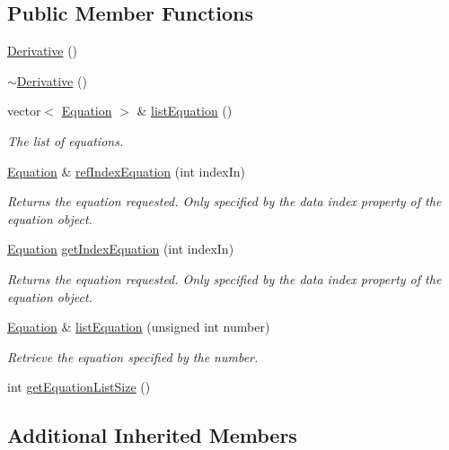 \subsection*{Public Member Functions}
\begin{DoxyCompactItemize}
\item 
\hyperlink{class_derivative_adc03ec3ad150bc0de66a3e7200cd368f}{Derivative} ()
\item 
\hyperlink{class_derivative_a7fc4ee53f460dfb98b3db2e9c9830cf9}{$\sim$\-Derivative} ()
\item 
vector$<$ \hyperlink{class_equation}{Equation} $>$ \& \hyperlink{class_derivative_a7fa63ee738fcafcf3fccb796da095946}{list\-Equation} ()
\begin{DoxyCompactList}\small\item\em The list of equations. \end{DoxyCompactList}\item 
\hyperlink{class_equation}{Equation} \& \hyperlink{class_derivative_a432dcf928635e6f77801ae7b546656fe}{ref\-Index\-Equation} (int index\-In)
\begin{DoxyCompactList}\small\item\em Returns the equation requested. Only specified by the data index property of the equation object. \end{DoxyCompactList}\item 
\hyperlink{class_equation}{Equation} \hyperlink{class_derivative_af9b75e66d998bc3ad82250c6667d0c17}{get\-Index\-Equation} (int index\-In)
\begin{DoxyCompactList}\small\item\em Returns the equation requested. Only specified by the data index property of the equation object. \end{DoxyCompactList}\item 
\hyperlink{class_equation}{Equation} \& \hyperlink{class_derivative_a57fc9f8fc2bb6b416b9ade4f79f2bf1d}{list\-Equation} (unsigned int number)
\begin{DoxyCompactList}\small\item\em Retrieve the equation specified by the number. \end{DoxyCompactList}\item 
int \hyperlink{class_derivative_ac95af6fb993314a578b3f0d3cd57a9cc}{get\-Equation\-List\-Size} ()
\end{DoxyCompactItemize}
\subsection*{Additional Inherited Members}


